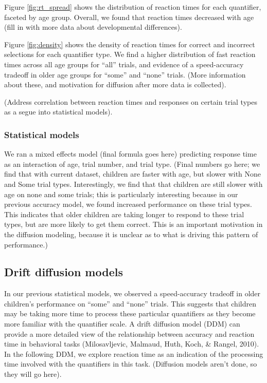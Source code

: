 \documentclass[10pt, letterpaper]{article}
\begin{document}
Figure \ref{fig:rt_spread} shows the distribution of reaction times for
each quantifier, faceted by age group. Overall, we found that reaction
times decreased with age (fill in with more data about developmental
differences).

Figure \ref{fig:density} shows the density of reaction times for correct
and incorrect selections for each quantifier type. We find a higher
distribution of fast reaction times across all age groups for ``all''
trials, and evidence of a speed-accuracy tradeoff in older age groups
for ``some'' and ``none'' trials. (More information about these, and
motivation for diffusion after more data is collected).

(Address correlation between reaction times and responses on certain
trial types as a segue into statistical models).

\subsubsection{Statistical models}\label{statistical-models}

We ran a mixed effects model (final formula goes here) predicting
response time as an interaction of age, trial number, and trial type.
(Final numbers go here; we find that with current dataset, children are
faster with age, but slower with None and Some trial types.
Interestingly, we find that that children are still slower with age on
none and some trials; this is particularly interesting because in our
previous accuracy model, we found increased performance on these trial
types. This indicates that older children are taking longer to respond
to these trial types, but are more likely to get them correct. This is
an important motivation in the diffusion modeling, because it is unclear
as to what is driving this pattern of performance.)

\subsection{Drift diffusion models}\label{drift-diffusion-models}

In our previous statistical models, we observed a speed-accuracy
tradeoff in older children's performance on ``some'' and ``none''
trials. This suggests that children may be taking more time to process
these particular quantifiers as they become more familiar with the
quantifier scale. A drift diffusion model (DDM) can provide a more
detailed view of the relationship between accuracy and reaction time in
behavioral tasks (Milosavljevic, Malmaud, Huth, Koch, \& Rangel, 2010).
In the following DDM, we explore reaction time as an indication of the
processing time involved with the quantifiers in this task. (Diffusion
models aren't done, so they will go here).
\end{document}
